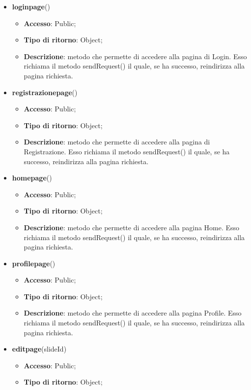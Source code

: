 {\begin{itemize}
\begin{itemize}
			\end{itemize}
			\item \textbf{loginpage}()
			\begin{itemize}
				\item \textbf{Accesso}: Public;
				\item \textbf{Tipo di ritorno}: Object;
				\item \textbf{Descrizione}: metodo che permette di accedere alla pagina di Login. Esso richiama il metodo sendRequest() il quale, se ha successo, reindirizza alla pagina richiesta.
			\end{itemize}
			\item \textbf{registrazionepage}()
			\begin{itemize}
				\item \textbf{Accesso}: Public;
				\item \textbf{Tipo di ritorno}: Object;
				\item \textbf{Descrizione}: metodo che permette di accedere alla pagina di Registrazione. Esso richiama il metodo sendRequest() il quale, se ha successo, reindirizza alla pagina richiesta.
			\end{itemize}
			\item \textbf{homepage}()
			\begin{itemize}
				\item \textbf{Accesso}: Public;
				\item \textbf{Tipo di ritorno}: Object;
				\item \textbf{Descrizione}: metodo che permette di accedere alla pagina Home. Esso richiama il metodo sendRequest() il quale, se ha successo, reindirizza alla pagina richiesta.
			\end{itemize}
			\item \textbf{profilepage}()
			\begin{itemize}
				\item \textbf{Accesso}: Public;
				\item \textbf{Tipo di ritorno}: Object;
				\item \textbf{Descrizione}: metodo che permette di accedere alla pagina Profile. Esso richiama il metodo sendRequest() il quale, se ha successo, reindirizza alla pagina richiesta.
			\end{itemize}
			\item \textbf{editpage}(slideId)
			\begin{itemize}
				\item \textbf{Accesso}: Public;
				\item \textbf{Tipo di ritorno}: Object;

\end{itemize}
\end{itemize}}
